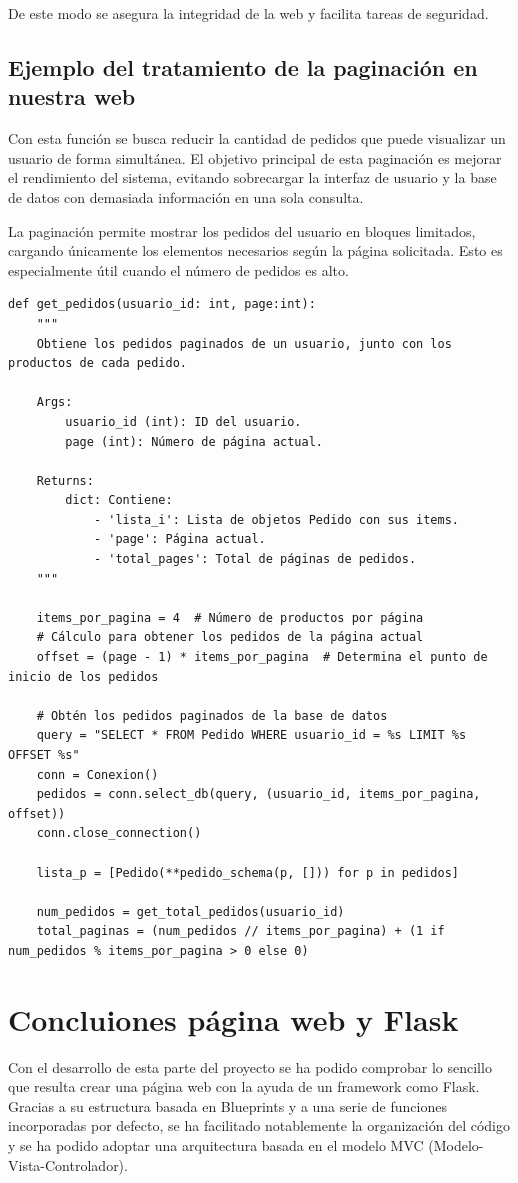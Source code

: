\documentclass[10pt]{book}
\begin{document}
De este modo se asegura la integridad de la web y facilita tareas de seguridad.

\subsection{Ejemplo del tratamiento de la paginación en nuestra web}
Con esta función se busca reducir la cantidad de pedidos que puede visualizar un usuario de forma simultánea. El objetivo principal de esta paginación es mejorar el rendimiento del sistema, evitando sobrecargar la interfaz de usuario y la base de datos con demasiada información en una sola consulta.

La paginación permite mostrar los pedidos del usuario en bloques limitados, cargando únicamente los elementos necesarios según la página solicitada. Esto es especialmente útil cuando el número de pedidos es alto.

\begin{lstlisting}[style=pythonclean, caption={Obtener pedidos de un usuario}]
def get_pedidos(usuario_id: int, page:int):
    """
    Obtiene los pedidos paginados de un usuario, junto con los productos de cada pedido.

    Args:
        usuario_id (int): ID del usuario.
        page (int): Número de página actual.

    Returns:
        dict: Contiene:
            - 'lista_i': Lista de objetos Pedido con sus items.
            - 'page': Página actual.
            - 'total_pages': Total de páginas de pedidos.
    """

    items_por_pagina = 4  # Número de productos por página
    # Cálculo para obtener los pedidos de la página actual
    offset = (page - 1) * items_por_pagina  # Determina el punto de inicio de los pedidos

    # Obtén los pedidos paginados de la base de datos
    query = "SELECT * FROM Pedido WHERE usuario_id = %s LIMIT %s OFFSET %s"
    conn = Conexion()
    pedidos = conn.select_db(query, (usuario_id, items_por_pagina, offset))
    conn.close_connection()

    lista_p = [Pedido(**pedido_schema(p, [])) for p in pedidos]

    num_pedidos = get_total_pedidos(usuario_id)
    total_paginas = (num_pedidos // items_por_pagina) + (1 if num_pedidos % items_por_pagina > 0 else 0)
\end{lstlisting}
\newpage
\section{Concluiones página web y Flask}
 Con el desarrollo de esta parte del proyecto se ha podido comprobar lo sencillo que resulta crear una página web con la ayuda de un framework como Flask. Gracias a su estructura basada en Blueprints y a una serie de funciones incorporadas por defecto, se ha facilitado notablemente la organización del código y se ha podido adoptar una arquitectura basada en el modelo MVC (Modelo-Vista-Controlador).\\
\end{document}
